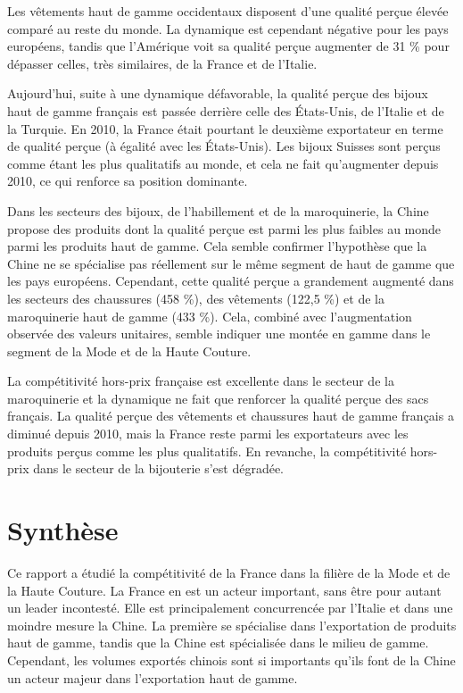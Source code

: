 \documentclass[french,10pt,a4paper]{article}
\begin{document}
Les vêtements haut de gamme occidentaux disposent d'une qualité perçue élevée comparé au reste du monde. La dynamique est cependant négative pour les pays européens, tandis que l'Amérique voit sa qualité perçue augmenter de 31 \% pour dépasser celles, très similaires, de la France et de l'Italie.

Aujourd'hui, suite à une dynamique défavorable, la qualité perçue des bijoux haut de gamme français est passée derrière celle des États-Unis, de l'Italie et de la Turquie. En 2010, la France était pourtant le deuxième exportateur en terme de qualité perçue (à égalité avec les États-Unis). Les bijoux Suisses sont perçus comme étant les plus qualitatifs au monde, et cela ne fait qu'augmenter depuis 2010, ce qui renforce sa position dominante.

Dans les secteurs des bijoux, de l'habillement et de la maroquinerie, la Chine propose des produits dont la qualité perçue est parmi les plus faibles au monde parmi les produits haut de gamme. Cela semble confirmer l'hypothèse que la Chine ne se spécialise pas réellement sur le même segment de haut de gamme que les pays européens. Cependant, cette qualité perçue a grandement augmenté dans les secteurs des chaussures (458 \%), des vêtements (122,5 \%) et de la maroquinerie haut de gamme (433 \%). Cela, combiné avec l'augmentation observée des valeurs unitaires, semble indiquer une montée en gamme dans le segment de la Mode et de la Haute Couture.

\bigskip

La compétitivité hors-prix française est excellente dans le secteur de la maroquinerie et la dynamique ne fait que renforcer la qualité perçue des sacs français. La qualité perçue des vêtements et chaussures haut de gamme français a diminué depuis 2010, mais la France reste parmi les exportateurs avec les produits perçus comme les plus qualitatifs. En revanche, la compétitivité hors-prix dans le secteur de la bijouterie s'est dégradée.





\newpage
\section{Synthèse}

Ce rapport a étudié la compétitivité de la France dans la filière de la Mode et de la Haute Couture. La France en est un acteur important, sans être pour autant un leader incontesté. Elle est principalement concurrencée par l'Italie et dans une moindre mesure la Chine. La première se spécialise dans l'exportation de produits haut de gamme, tandis que la Chine est spécialisée dans le milieu de gamme. Cependant, les volumes exportés chinois sont si importants qu'ils font de la Chine un acteur majeur dans l'exportation haut de gamme.
\end{document}
